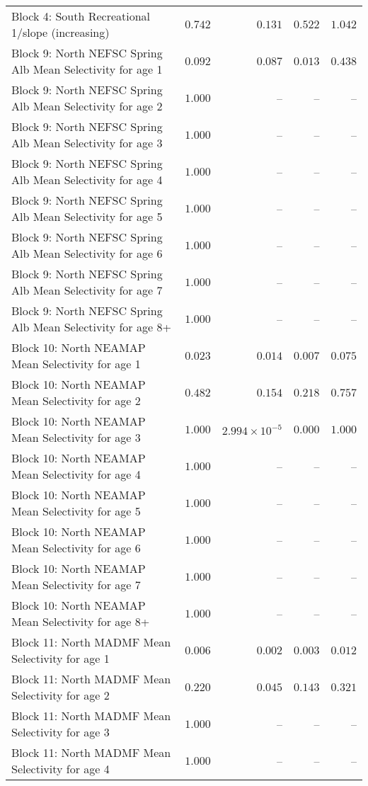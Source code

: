 \documentclass[
]{article}
\begin{document}
\begin{landscape}
\begin{longtable}[t]{lrrrr}
Block 4: South Recreational 1/slope (increasing) & $0.742$ & $0.131$ & $0.522$ & $1.042$\\
Block 9: North NEFSC Spring Alb Mean Selectivity for age 1 & $0.092$ & $0.087$ & $0.013$ & $0.438$\\
Block 9: North NEFSC Spring Alb Mean Selectivity for age 2 & $1.000$ & -- & -- & --\\
Block 9: North NEFSC Spring Alb Mean Selectivity for age 3 & $1.000$ & -- & -- & --\\
\addlinespace
Block 9: North NEFSC Spring Alb Mean Selectivity for age 4 & $1.000$ & -- & -- & --\\
Block 9: North NEFSC Spring Alb Mean Selectivity for age 5 & $1.000$ & -- & -- & --\\
Block 9: North NEFSC Spring Alb Mean Selectivity for age 6 & $1.000$ & -- & -- & --\\
Block 9: North NEFSC Spring Alb Mean Selectivity for age 7 & $1.000$ & -- & -- & --\\
Block 9: North NEFSC Spring Alb Mean Selectivity for age 8+ & $1.000$ & -- & -- & --\\
\addlinespace
Block 10: North NEAMAP Mean Selectivity for age 1 & $0.023$ & $0.014$ & $0.007$ & $0.075$\\
Block 10: North NEAMAP Mean Selectivity for age 2 & $0.482$ & $0.154$ & $0.218$ & $0.757$\\
Block 10: North NEAMAP Mean Selectivity for age 3 & $1.000$ & $2.994\times 10^{-5}$ & $0.000$ & $1.000$\\
Block 10: North NEAMAP Mean Selectivity for age 4 & $1.000$ & -- & -- & --\\
Block 10: North NEAMAP Mean Selectivity for age 5 & $1.000$ & -- & -- & --\\
\addlinespace
Block 10: North NEAMAP Mean Selectivity for age 6 & $1.000$ & -- & -- & --\\
Block 10: North NEAMAP Mean Selectivity for age 7 & $1.000$ & -- & -- & --\\
Block 10: North NEAMAP Mean Selectivity for age 8+ & $1.000$ & -- & -- & --\\
Block 11: North MADMF Mean Selectivity for age 1 & $0.006$ & $0.002$ & $0.003$ & $0.012$\\
Block 11: North MADMF Mean Selectivity for age 2 & $0.220$ & $0.045$ & $0.143$ & $0.321$\\
\addlinespace
Block 11: North MADMF Mean Selectivity for age 3 & $1.000$ & -- & -- & --\\
Block 11: North MADMF Mean Selectivity for age 4 & $1.000$ & -- & -- & --\\

\end{longtable}
\end{landscape}
\end{document}
